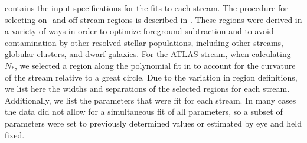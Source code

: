 \documentclass[twocolumn]{aastex61}
\begin{document}
 contains the input specifications for the fits to each stream. The procedure for selecting on- and off-stream regions is described in . These regions were derived in a variety of ways in order to optimize foreground subtraction and to avoid contamination by other resolved stellar populations, including other streams, globular clusters, and dwarf galaxies. For the ATLAS stream, when calculating $N_*$, we selected a region along the polynomial fit in  to account for the curvature of the stream relative to a great circle. Due to the variation in region definitions, we list here the widths and separations of the selected regions for each stream. Additionally, we list the parameters that were fit for each stream. In many cases the data did not allow for a simultaneous fit of all parameters, so a subset of parameters were set to previously determined values or estimated by eye and held fixed.



\clearpage

%


\end{document}
